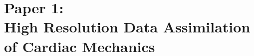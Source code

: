 

\graphicspath{{chapters/paper1/figures/}}


\chapter{Paper 1: \\High Resolution Data Assimilation of Cardiac
  Mechanics}




\clearpage


% 



